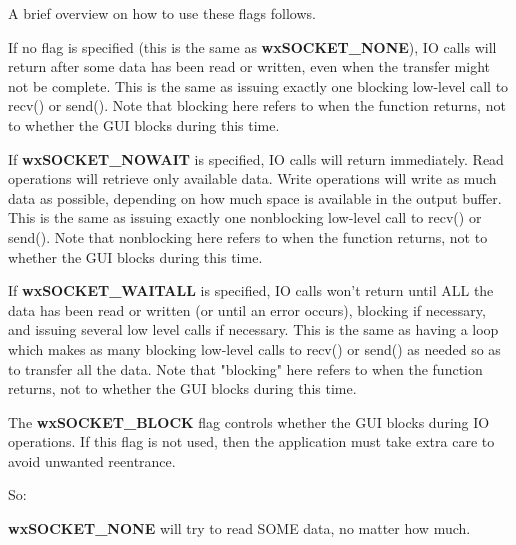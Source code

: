 \label{wxsocketbasesetflags}


\twocolwidtha{7cm}
\begin{twocollist}\itemsep=0pt
\end{twocollist}

A brief overview on how to use these flags follows.

If no flag is specified (this is the same as {\bf wxSOCKET\_NONE}),
IO calls will return after some data has been read or written, even
when the transfer might not be complete. This is the same as issuing
exactly one blocking low-level call to recv() or send(). Note that
blocking here refers to when the function returns, not to whether
the GUI blocks during this time.

If {\bf wxSOCKET\_NOWAIT} is specified, IO calls will return immediately.
Read operations will retrieve only available data. Write operations will
write as much data as possible, depending on how much space is available
in the output buffer. This is the same as issuing exactly one nonblocking
low-level call to recv() or send(). Note that nonblocking here refers to
when the function returns, not to whether the GUI blocks during this time.

If {\bf wxSOCKET\_WAITALL} is specified, IO calls won't return until ALL
the data has been read or written (or until an error occurs), blocking if
necessary, and issuing several low level calls if necessary. This is the
same as having a loop which makes as many blocking low-level calls to
recv() or send() as needed so as to transfer all the data. Note that
"blocking" here refers to when the function returns, not to whether
the GUI blocks during this time.

The {\bf wxSOCKET\_BLOCK} flag controls whether the GUI blocks during
IO operations. If this flag is not used, then the application must take
extra care to avoid unwanted reentrance. 

So:

{\bf wxSOCKET\_NONE} will try to read SOME data, no matter how much.

